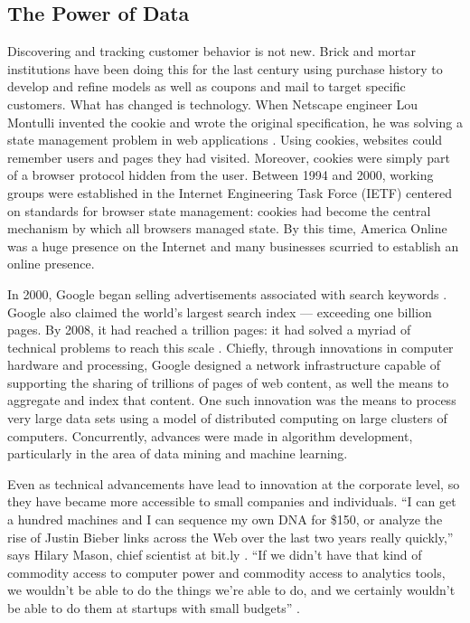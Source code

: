 \subsection{The Power of Data}
\label{thepowerofdata}

Discovering and tracking customer behavior is not new. Brick and mortar institutions have been doing this for the last century using purchase history to develop and refine models as well as coupons and mail to target specific customers. What has changed is technology. When Netscape engineer Lou Montulli invented the cookie and wrote the original specification, he was solving a state management problem in web applications  \citep{Kristol:2001dg}.  Using cookies, websites could remember users and pages they had visited. Moreover, cookies were simply part of a browser protocol hidden from the user. Between 1994 and 2000, working groups were established in the Internet Engineering Task Force (IETF) centered on standards for browser state management: cookies had become the central mechanism by which all browsers managed state. By this time, America Online was a huge presence on the Internet and many businesses scurried to establish an online presence.

In 2000, Google began selling advertisements associated with search keywords  \citep{Google:2010:online}.  Google also claimed the world's largest search index --- exceeding one billion pages. By 2008, it had reached a trillion pages: it had solved a myriad of technical problems to reach this scale  \citep{Google:2010:online}.  Chiefly, through innovations in computer hardware and processing, Google designed a network infrastructure capable of supporting the sharing of trillions of pages of web content, as well the means to aggregate and index that content. One such innovation was the means to process very large data sets using a model of distributed computing on large clusters of computers. Concurrently, advances were made in algorithm development, particularly in the area of data mining and machine learning. 

Even as technical advancements have lead to innovation at the corporate level, so they have became more accessible to small companies and individuals. ``I can get a hundred machines and I can sequence my own DNA for \$150, or analyze the rise of Justin Bieber links across the Web over the last two years really quickly,'' says Hilary Mason, chief scientist at bit.ly  \citep[as cited in][]{Woods:y1szIP7L}.  ``If we didn't have that kind of commodity access to computer power and commodity access to analytics tools, we wouldn't be able to do the things we're able to do, and we certainly wouldn't be able to do them at startups with small budgets''  \citep{Woods:y1szIP7L}. 

